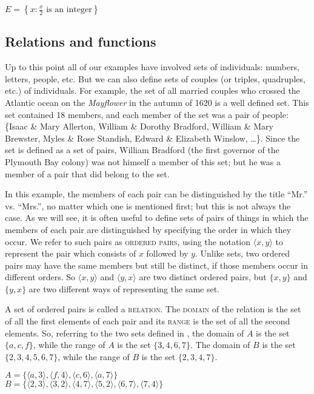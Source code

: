 \ea \label{ex:13.6}
$\displaystyle E = \left\{x: \frac{x}{2} \text{ is an integer}\right\}$
\z

\subsection{Relations and functions}\label{sec:13.3.1}

Up to this point all of our examples have involved sets of individuals: numbers, letters, people, etc. But we can also define sets of couples (or triples, quadruples, etc.) of individuals. For example, the set of all married couples who crossed the {Atlantic} ocean on the \textit{Mayflower} in the autumn of 1620 is a well defined set. This set contained 18 members, and each member of the set was a pair of people: \{Isaac \& Mary Allerton, William \& Dorothy Bradford, William \& Mary Brewster, Myles \& Rose Standish, Edward \& Elizabeth Winslow, …\}. Since the set is defined as a set of pairs, William Bradford (the first governor of the Plymouth Bay colony) was not himself a member of this set; but he was a member of a pair that did belong to the set.



In this example, the members of each pair can be distinguished by the title “Mr.” vs. “Mrs.”, no matter which one is mentioned first; but this is not always the case. As we will see, it is often useful to define sets of pairs of things in which the members of each pair are distinguished by specifying the order in which they occur. We refer to such pairs as \textsc{ordered pairs}, using the notation $\langle x,y\rangle$ to represent the pair which consists of $x$ followed by $y$. Unlike sets, two ordered pairs may have the same members but still be distinct, if those members occur in different orders. So $\langle x,y\rangle$ and $\langle y,x\rangle$ are two distinct ordered pairs, but $\{x,y\}$ and $\{y,x\}$ are two different ways of representing the same set.



A set of ordered pairs is called a \textsc{relation}. The \textsc{domain} of the relation is the set of all the first elements of each pair and its \textsc{range} is the set of all the second elements. So, referring to the two sets defined in , the domain of $A$ is the set $\{a,c,f\}$, while the range of $A$ is the set $\{3,4,6,7\}$. The domain of $B$ is the set $\{2,3,4,5,6,7\}$, while the range of $B$ is the set $\{2,3,4,7\}$. 


\ea \label{ex:13.7}
$A = \{\langle a,3\rangle, \langle f,4\rangle, \langle c,6\rangle, \langle a,7\rangle\}$\\
$B = \{\langle 2,3\rangle, \langle 3,2\rangle, \langle 4,7\rangle, \langle 5,2\rangle, \langle 6,7\rangle, \langle 7,4\rangle\}$
\z                                                                         


